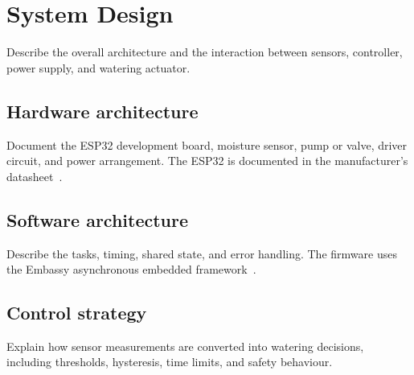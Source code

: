 \chapter{System Design}
\label{chap:system-design}

Describe the overall architecture and the interaction between sensors,
controller, power supply, and watering actuator.

\section{Hardware architecture}

Document the ESP32 development board, moisture sensor, pump or valve, driver
circuit, and power arrangement. The ESP32 is documented in the manufacturer's
datasheet~\cite{esp32-datasheet}.

\section{Software architecture}

Describe the tasks, timing, shared state, and error handling. The firmware uses
the Embassy asynchronous embedded framework~\cite{embassy-book}.

\section{Control strategy}

Explain how sensor measurements are converted into watering decisions,
including thresholds, hysteresis, time limits, and safety behaviour.
